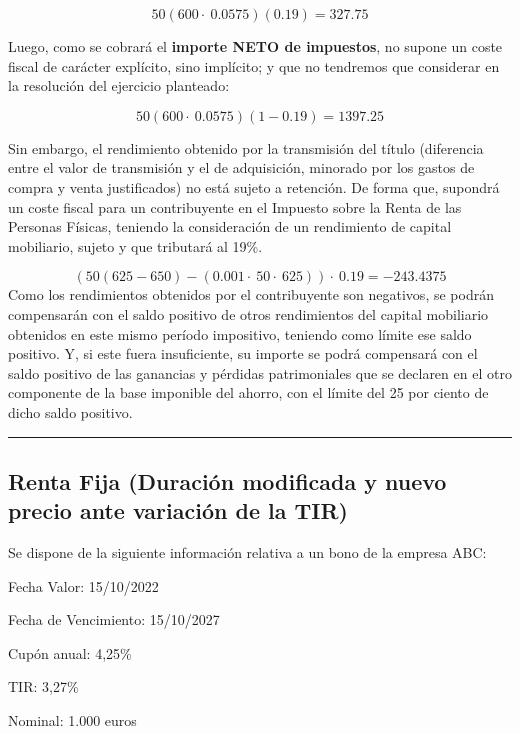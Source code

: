 \documentclass[
  letterpaper,
  DIV=11,
  numbers=noendperiod]{scrreprt}
\begin{document}
\begin{tcolorbox}
\begin{tcolorbox}
\[50\left(600\cdot \:0.0575\right)\left(0.19\right)=327.75\]

Luego, como se cobrará el \textbf{importe NETO de impuestos}, no supone
un coste fiscal de carácter explícito, sino implícito; y que no
tendremos que considerar en la resolución del ejercicio planteado:

\[50\left(600\cdot \:0.0575\right)\left(1-0.19\right)=1397.25\]

Sin embargo, el rendimiento obtenido por la transmisión del título
(diferencia entre el valor de transmisión y el de adquisición, minorado
por los gastos de compra y venta justificados) no está sujeto a
retención. De forma que, supondrá un coste fiscal para un contribuyente
en el Impuesto sobre la Renta de las Personas Físicas, teniendo la
consideración de un rendimiento de capital mobiliario, sujeto y que
tributará al 19\%.

\[\left(50\left(625-650\right)-\left(0.001\cdot \:50\cdot \:625\right)\right)\cdot \:0.19=-243.4375\]
Como los rendimientos obtenidos por el contribuyente son negativos, se
podrán compensarán con el saldo positivo de otros rendimientos del
capital mobiliario obtenidos en este mismo período impositivo, teniendo
como límite ese saldo positivo. Y, si este fuera insuficiente, su
importe se podrá compensará con el saldo positivo de las ganancias y
pérdidas patrimoniales que se declaren en el otro componente de la base
imponible del ahorro, con el límite del 25 por ciento de dicho saldo
positivo.

\end{tcolorbox}

\begin{center}\rule{0.5\linewidth}{0.5pt}\end{center}

\subsection{Renta Fija (Duración modificada y nuevo precio ante
variación de la
TIR)}\label{renta-fija-duraciuxf3n-modificada-y-nuevo-precio-ante-variaciuxf3n-de-la-tir-1}

Se dispone de la siguiente información relativa a un bono de la empresa
ABC:

Fecha Valor: 15/10/2022

Fecha de Vencimiento: 15/10/2027

Cupón anual: 4,25\%

TIR: 3,27\%

Nominal: 1.000 euros


\end{tcolorbox}
\end{document}
